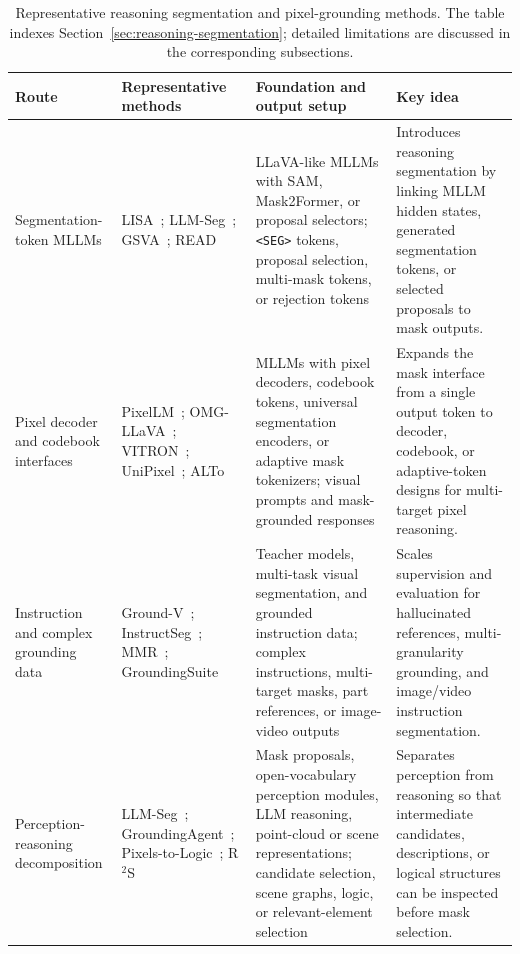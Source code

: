 \begin{table}[t]
\centering
\small
\setlength{\tabcolsep}{4pt}
\renewcommand{\arraystretch}{1.32}
\caption{Representative reasoning segmentation and pixel-grounding methods. The table indexes Section~\ref{sec:reasoning-segmentation}; detailed limitations are discussed in the corresponding subsections.}
\label{tab:reasoning-methods}
\begin{tabularx}{\textwidth}{>{\raggedright\arraybackslash}p{}>{\raggedright\arraybackslash}X>{\raggedright\arraybackslash}p{}>{\raggedright\arraybackslash}p{}}
\toprule
Route & Representative methods & Foundation and output setup & Key idea \\
\midrule
Segmentation-token MLLMs & LISA~\citep{xlaiLisaReasoningSegmentation2024}; LLM-Seg~\citep{jwangLlmsegBridgingImage2024}; GSVA~\citep{xiaGsvaGeneralizedSegmentation2024}; READ~\citep{qianReasoningAttendTry2025} & LLaVA-like MLLMs with SAM, Mask2Former, or proposal selectors; \texttt{<SEG>} tokens, proposal selection, multi-mask tokens, or rejection tokens & Introduces reasoning segmentation by linking MLLM hidden states, generated segmentation tokens, or selected proposals to mask outputs. \\
Pixel decoder and codebook interfaces & PixelLM~\citep{renPixellmPixelReasoning2024}; OMG-LLaVA~\citep{zhangOmgllavaBridgingImagelevel2024}; VITRON~\citep{feiVitronUnifiedPixellevel2024}; UniPixel~\citep{liuUnipixelUnifiedObject2026}; ALTo~\citep{wangAltoAdaptivelengthTokenizer2026} & MLLMs with pixel decoders, codebook tokens, universal segmentation encoders, or adaptive mask tokenizers; visual prompts and mask-grounded responses & Expands the mask interface from a single output token to decoder, codebook, or adaptive-token designs for multi-target pixel reasoning. \\
Instruction and complex grounding data & Ground-V~\citep{zongGroundvTeachingVlms2025}; InstructSeg~\citep{weiInstructsegUnifyingInstructed2025}; MMR~\citep{jangMmrLargescaleBenchmark2025}; GroundingSuite~\citep{huGroundingSuiteMeasuringComplex2025} & Teacher models, multi-task visual segmentation, and grounded instruction data; complex instructions, multi-target masks, part references, or image-video outputs & Scales supervision and evaluation for hallucinated references, multi-granularity grounding, and image/video instruction segmentation. \\
Perception-reasoning decomposition & LLM-Seg~\citep{jwangLlmsegBridgingImage2024}; GroundingAgent~\citep{luoConnectingDotsTrainingFree2026}; Pixels-to-Logic~\citep{huangPixelsLogicPerceptionReasoning2026}; R$^2$S~\citep{ningEnhancingSpatialReasoning2025} & Mask proposals, open-vocabulary perception modules, LLM reasoning, point-cloud or scene representations; candidate selection, scene graphs, logic, or relevant-element selection & Separates perception from reasoning so that intermediate candidates, descriptions, or logical structures can be inspected before mask selection. \\

\end{tabularx}
\end{table}
